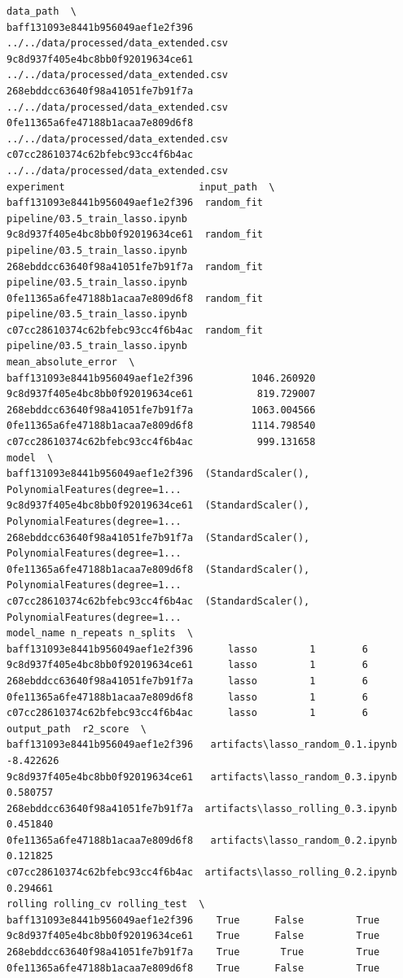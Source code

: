 \begin{verbatim}
data_path  \
baff131093e8441b956049aef1e2f396  ../../data/processed/data_extended.csv
9c8d937f405e4bc8bb0f92019634ce61  ../../data/processed/data_extended.csv
268ebddcc63640f98a41051fe7b91f7a  ../../data/processed/data_extended.csv
0fe11365a6fe47188b1acaa7e809d6f8  ../../data/processed/data_extended.csv
c07cc28610374c62bfebc93cc4f6b4ac  ../../data/processed/data_extended.csv
experiment                       input_path  \
baff131093e8441b956049aef1e2f396  random_fit  pipeline/03.5_train_lasso.ipynb
9c8d937f405e4bc8bb0f92019634ce61  random_fit  pipeline/03.5_train_lasso.ipynb
268ebddcc63640f98a41051fe7b91f7a  random_fit  pipeline/03.5_train_lasso.ipynb
0fe11365a6fe47188b1acaa7e809d6f8  random_fit  pipeline/03.5_train_lasso.ipynb
c07cc28610374c62bfebc93cc4f6b4ac  random_fit  pipeline/03.5_train_lasso.ipynb
mean_absolute_error  \
baff131093e8441b956049aef1e2f396          1046.260920
9c8d937f405e4bc8bb0f92019634ce61           819.729007
268ebddcc63640f98a41051fe7b91f7a          1063.004566
0fe11365a6fe47188b1acaa7e809d6f8          1114.798540
c07cc28610374c62bfebc93cc4f6b4ac           999.131658
model  \
baff131093e8441b956049aef1e2f396  (StandardScaler(), PolynomialFeatures(degree=1...
9c8d937f405e4bc8bb0f92019634ce61  (StandardScaler(), PolynomialFeatures(degree=1...
268ebddcc63640f98a41051fe7b91f7a  (StandardScaler(), PolynomialFeatures(degree=1...
0fe11365a6fe47188b1acaa7e809d6f8  (StandardScaler(), PolynomialFeatures(degree=1...
c07cc28610374c62bfebc93cc4f6b4ac  (StandardScaler(), PolynomialFeatures(degree=1...
model_name n_repeats n_splits  \
baff131093e8441b956049aef1e2f396      lasso         1        6
9c8d937f405e4bc8bb0f92019634ce61      lasso         1        6
268ebddcc63640f98a41051fe7b91f7a      lasso         1        6
0fe11365a6fe47188b1acaa7e809d6f8      lasso         1        6
c07cc28610374c62bfebc93cc4f6b4ac      lasso         1        6
output_path  r2_score  \
baff131093e8441b956049aef1e2f396   artifacts\lasso_random_0.1.ipynb -8.422626
9c8d937f405e4bc8bb0f92019634ce61   artifacts\lasso_random_0.3.ipynb  0.580757
268ebddcc63640f98a41051fe7b91f7a  artifacts\lasso_rolling_0.3.ipynb  0.451840
0fe11365a6fe47188b1acaa7e809d6f8   artifacts\lasso_random_0.2.ipynb  0.121825
c07cc28610374c62bfebc93cc4f6b4ac  artifacts\lasso_rolling_0.2.ipynb  0.294661
rolling rolling_cv rolling_test  \
baff131093e8441b956049aef1e2f396    True      False         True
9c8d937f405e4bc8bb0f92019634ce61    True      False         True
268ebddcc63640f98a41051fe7b91f7a    True       True         True
0fe11365a6fe47188b1acaa7e809d6f8    True      False         True

\end{verbatim}
